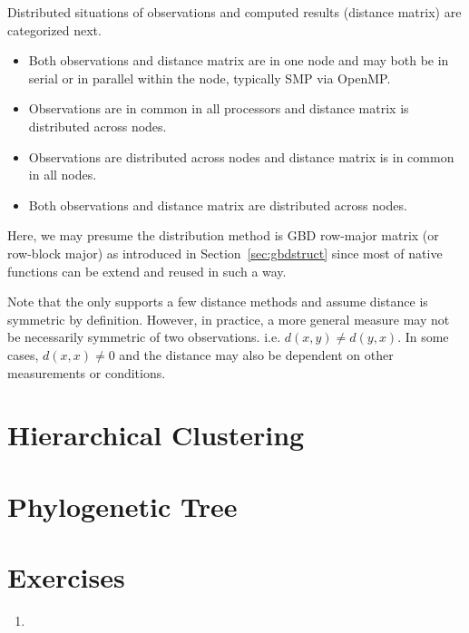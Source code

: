 Distributed situations of observations and computed results (distance
matrix) are categorized next.
\begin{itemize}
\item Both observations and distance matrix are in one node and may both be
      in serial or in parallel within the node, typically SMP via OpenMP.
\item Observations are in common in all processors
      and distance matrix is distributed across nodes.
\item Observations are distributed across nodes
      and distance matrix is in common in all nodes.
\item Both observations and distance matrix are distributed
      across nodes.
\end{itemize}
Here, we may presume the distribution method is GBD row-major matrix (or
row-block major) as introduced in Section~\ref{sec:gbdstruct} since most of
native  functions can be extend and reused in such a way.

Note that the  only supports a few distance methods and assume
distance is symmetric by definition. However,
in practice, a more general measure may not be necessarily
symmetric of two observations. i.e. $d(x, y) \neq d(y, x)$.
In some cases, $d(x, x) \neq 0$ and the distance may also be dependent
on other measurements or conditions.


\section{Hierarchical Clustering}



\section{Phylogenetic Tree}



\section{Exercises}
\label{sec:pairwise_exercise}

\begin{enumerate}[label=\thechapter-\arabic*]

\item

\end{enumerate}


